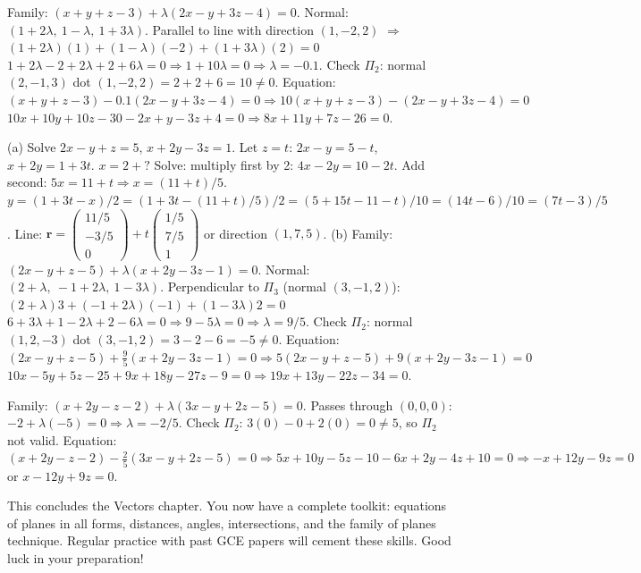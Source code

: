 \documentclass[11pt]{article}
\begin{document}
\begin{corrige}[Exercise 3]
Family: $(x+y+z-3)+\lambda(2x-y+3z-4)=0$.
Normal: $(1+2\lambda,\ 1-\lambda,\ 1+3\lambda)$.
Parallel to line with direction $(1,-2,2)$ $\Rightarrow$ $(1+2\lambda)(1)+(1-\lambda)(-2)+(1+3\lambda)(2)=0$
$1+2\lambda-2+2\lambda+2+6\lambda=0 \Rightarrow 1+10\lambda=0 \Rightarrow \lambda=-0.1$.
Check $\Pi_2$: normal $(2,-1,3)$ dot $(1,-2,2)=2+2+6=10\neq0$.
Equation: $(x+y+z-3)-0.1(2x-y+3z-4)=0 \Rightarrow 10(x+y+z-3)-(2x-y+3z-4)=0$
$10x+10y+10z-30-2x+y-3z+4=0 \Rightarrow 8x+11y+7z-26=0$.
\end{corrige}

\begin{corrige}[Exercise 4]
(a) Solve $2x-y+z=5$, $x+2y-3z=1$. Let $z=t$: $2x-y=5-t$, $x+2y=1+3t$.
$x=2+?$ Solve: multiply first by 2: $4x-2y=10-2t$. Add second: $5x=11+t \Rightarrow x=(11+t)/5$.
$y=(1+3t-x)/2 = (1+3t-(11+t)/5)/2 = (5+15t-11-t)/10 = (14t-6)/10 = (7t-3)/5$.
Line: $\mathbf{r}=\begin{pmatrix}11/5\\-3/5\\0\end{pmatrix}+t\begin{pmatrix}1/5\\7/5\\1\end{pmatrix}$ or direction $(1,7,5)$.
(b) Family: $(2x-y+z-5)+\lambda(x+2y-3z-1)=0$.
Normal: $(2+\lambda,\ -1+2\lambda,\ 1-3\lambda)$.
Perpendicular to $\Pi_3$ (normal $(3,-1,2)$): $(2+\lambda)3+(-1+2\lambda)(-1)+(1-3\lambda)2=0$
$6+3\lambda+1-2\lambda+2-6\lambda=0 \Rightarrow 9-5\lambda=0 \Rightarrow \lambda=9/5$.
Check $\Pi_2$: normal $(1,2,-3)$ dot $(3,-1,2)=3-2-6=-5\neq0$.
Equation: $(2x-y+z-5)+\frac{9}{5}(x+2y-3z-1)=0 \Rightarrow 5(2x-y+z-5)+9(x+2y-3z-1)=0$
$10x-5y+5z-25+9x+18y-27z-9=0 \Rightarrow 19x+13y-22z-34=0$.
\end{corrige}

\begin{corrige}[Exercise 5]
Family: $(x+2y-z-2)+\lambda(3x-y+2z-5)=0$.
Passes through $(0,0,0)$: $-2+\lambda(-5)=0 \Rightarrow \lambda=-2/5$.
Check $\Pi_2$: $3(0)-0+2(0)=0\neq5$, so $\Pi_2$ not valid.
Equation: $(x+2y-z-2)-\frac{2}{5}(3x-y+2z-5)=0 \Rightarrow 5x+10y-5z-10-6x+2y-4z+10=0 \Rightarrow -x+12y-9z=0$ or $x-12y+9z=0$.
\end{corrige}

This concludes the Vectors chapter. You now have a complete toolkit: equations of planes in all forms, distances, angles, intersections, and the family of planes technique. Regular practice with past GCE papers will cement these skills. Good luck in your preparation!
\end{document}
